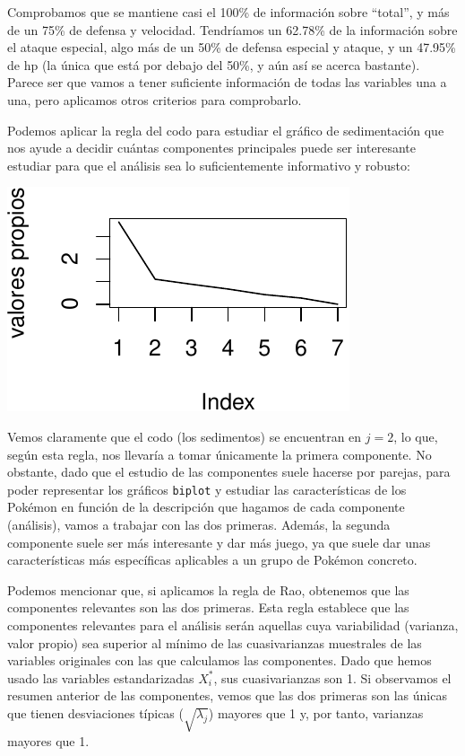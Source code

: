 \documentclass[
  12pt,
]{extreport}
\begin{document}
Comprobamos que se mantiene casi el 100\% de información sobre
``total'', y más de un 75\% de defensa y velocidad. Tendríamos un
62.78\% de la información sobre el ataque especial, algo más de un 50\%
de defensa especial y ataque, y un 47.95\% de hp (la única que está por
debajo del 50\%, y aún así se acerca bastante). Parece ser que vamos a
tener suficiente información de todas las variables una a una, pero
aplicamos otros criterios para comprobarlo.

Podemos aplicar la regla del codo para estudiar el gráfico de
sedimentación que nos ayude a decidir cuántas componentes principales
puede ser interesante estudiar para que el análisis sea lo
suficientemente informativo y robusto:

\begin{center}
\includegraphics{trabajo_files/figure-pdf/unnamed-chunk-25-1.pdf}
\end{center}

Vemos claramente que el codo (los sedimentos) se encuentran en
\(j = 2\), lo que, según esta regla, nos llevaría a tomar únicamente la
primera componente. No obstante, dado que el estudio de las componentes
suele hacerse por parejas, para poder representar los gráficos
\texttt{biplot} y estudiar las características de los Pokémon en función
de la descripción que hagamos de cada componente (análisis), vamos a
trabajar con las dos primeras. Además, la segunda componente suele ser
más interesante y dar más juego, ya que suele dar unas características
más específicas aplicables a un grupo de Pokémon concreto.

Podemos mencionar que, si aplicamos la regla de Rao, obtenemos que las
componentes relevantes son las dos primeras. Esta regla establece que
las componentes relevantes para el análisis serán aquellas cuya
variabilidad (varianza, valor propio) sea superior al mínimo de las
cuasivarianzas muestrales de las variables originales con las que
calculamos las componentes. Dado que hemos usado las variables
estandarizadas \(X_i^*\), sus cuasivarianzas son 1. Si observamos el
resumen anterior de las componentes, vemos que las dos primeras son las
únicas que tienen desviaciones típicas (\(\sqrt{\lambda_j}\)) mayores
que 1 y, por tanto, varianzas mayores que 1.
\end{document}
